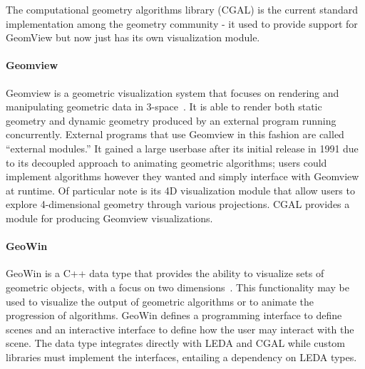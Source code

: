 The computational geometry algorithms library (CGAL) is the current standard
implementation among the geometry community - it used to provide support for
GeomView but now just has its own visualization module.

\paragraph{Geomview}

Geomview is a geometric visualization system that focuses on rendering and
manipulating geometric data in 3-space~\cite{phillips1993geomview,
hanson1994interactive, amenta1995geomview}. It is able to render both static
geometry and dynamic geometry produced by an external program running
concurrently. External programs that use Geomview in this fashion are called
``external modules.'' It gained a large userbase after its initial release in 1991
due to its decoupled approach to animating geometric algorithms; users could
implement algorithms however they wanted and simply interface with Geomview at
runtime. Of particular note is its 4D visualization module that allow users to
explore 4-dimensional geometry through various projections. CGAL provides a
module for producing Geomview visualizations.

\paragraph{GeoWin}

GeoWin is a C++ data type that provides the ability to visualize sets of
geometric objects, with a focus on two dimensions~\cite{basken2002geowin}. This
functionality may be used to visualize the output of geometric algorithms or to
animate the progression of algorithms. GeoWin defines a programming interface to
define scenes and an interactive interface to define how the user may interact
with the scene. The data type integrates directly with LEDA and CGAL while
custom libraries must implement the interfaces, entailing a dependency on LEDA
types.
